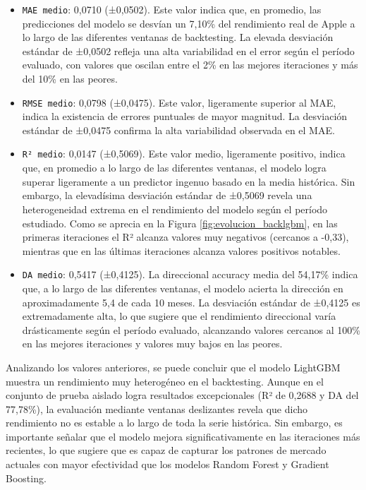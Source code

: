 \begin{enumerate}
    \begin{itemize}
        \item \texttt{MAE medio}: 0,0710 (±0,0502). Este valor indica que, en promedio, las predicciones del modelo se desvían un 7,10\% del rendimiento real de Apple a lo largo de las diferentes ventanas de backtesting. La elevada desviación estándar de ±0,0502 refleja una alta variabilidad en el error según el período evaluado, con valores que oscilan entre el 2\% en las mejores iteraciones y más del 10\% en las peores.
        \item \texttt{RMSE medio}: 0,0798 (±0,0475). Este valor, ligeramente superior al MAE, indica la existencia de errores puntuales de mayor magnitud. La desviación estándar de ±0,0475 confirma la alta variabilidad observada en el MAE.
        \item \texttt{R² medio}: 0,0147 (±0,5069). Este valor medio, ligeramente positivo, indica que, en promedio a lo largo de las diferentes ventanas, el modelo logra superar ligeramente a un predictor ingenuo basado en la media histórica. Sin embargo, la elevadísima desviación estándar de ±0,5069 revela una heterogeneidad extrema en el rendimiento del modelo según el período estudiado. Como se aprecia en la Figura \ref{fig:evolucion_backlgbm}, en las primeras iteraciones el R² alcanza valores muy negativos (cercanos a -0,33), mientras que en las últimas iteraciones alcanza valores positivos notables.
        \item \texttt{DA medio}: 0,5417 (±0,4125). La direccional accuracy media del 54,17\% indica que, a lo largo de las diferentes ventanas, el modelo acierta la dirección en aproximadamente 5,4 de cada 10 meses. La desviación estándar de ±0,4125 es extremadamente alta, lo que sugiere que el rendimiento direccional varía drásticamente según el período evaluado, alcanzando valores cercanos al 100\% en las mejores iteraciones y valores muy bajos en las peores.
    \end{itemize}

    Analizando los valores anteriores, se puede concluir que el modelo LightGBM muestra un rendimiento muy heterogéneo en el backtesting. Aunque en el conjunto de prueba aislado logra resultados excepcionales (R² de 0,2688 y DA del 77,78\%), la evaluación mediante ventanas deslizantes revela que dicho rendimiento no es estable a lo largo de toda la serie histórica. Sin embargo, es importante señalar que el modelo mejora significativamente en las iteraciones más recientes, lo que sugiere que es capaz de capturar los patrones de mercado actuales con mayor efectividad que los modelos Random Forest y Gradient Boosting.


\end{enumerate}
